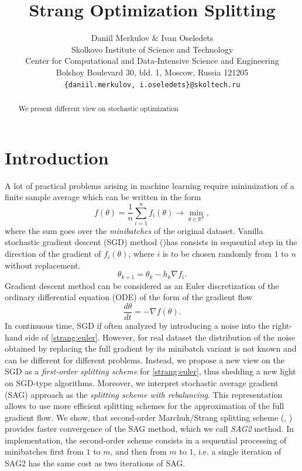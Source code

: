 \documentclass{article} %
\title{Strang Optimization Splitting}
\author{Daniil Merkulov \& Ivan Oseledets \\
Skolkovo Institute of Science and Technology\\
Center for Computational and Data-Intensive Science and Engineering\\
Bolshoy Boulevard 30, bld. 1, Moscow, Russia 121205 \\
\texttt{\{daniil.merkulov, i.oseledets\}@skoltech.ru} \\
}
\begin{document}
\maketitle

\begin{abstract}
We present different view on stochastic optimization
\end{abstract}

\section{Introduction}
A lot of practical problems arising in machine learning require minimization of a finite sample average which can be written in the form
\begin{equation}\label{strang:finitesum}
    f(\theta) = \frac{1}{n} \sum_{i=1}^n f_i(\theta) \rightarrow \min_{\theta \in \mathbb{R}^p},
\end{equation}
where the sum goes over the \emph{minibatches} of the original dataset. Vanilla stochastic gradient descent (SGD) method (\cite{robbins1951stochastic})has consists in sequential step in the direction of the gradient of $f_i(\theta)$, where $i$ is to be chosen randomly from $1$ to $n$ without replacement.
$$
    \theta_{k+1} = \theta_{k} - h_{k} \nabla f_i.
$$
Gradient descent method can be considered as an Euler discretization of the ordinary differential equation (ODE) of the form of the gradient flow
\begin{equation}\label{strang:euler}
    \frac{d \theta}{d t} = -\nabla f(\theta).
\end{equation}
In continuous time, SGD if often analyzed by introducing a noise into the right-hand side of \eqref{strang:euler}. However, for real dataset the distribution of the noise obtained by replacing the full gradient by its minibatch variant is not known and can be different for different problems. Instead, we propose a new view on the SGD as a \emph{first-order splitting scheme} for \eqref{strang:euler}, thus shedding a new light on SGD-type algorithms. Moreover, we interpret stochastic average gradient (SAG)\cite{schmidt2017minimizing} approach as the \emph{splitting scheme with rebalancing}. This representation allows to use more efficient splitting schemes for the approximation of the full gradient flow. We show, that second-order Marchuk/Strang splitting scheme (\cite{marchuk1968some}, \cite{strang1968construction}) provides faster convergence of the SAG method, which we call \emph{SAG2} method. In implementation, the second-order scheme consists in a sequential processing of minibatches first from $1$ to $m$, and then from $m$ to $1$, i.e. a single iteration of SAG2 has the same cost as two iterations of SAG.
\end{document}
